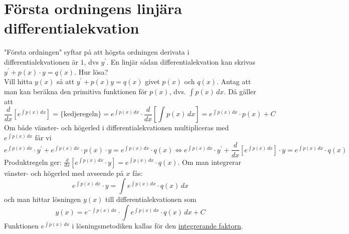\chapter{Första ordningens linjära differentialekvation}
"Första ordningen" syftar på att högsta ordningen derivata i differentialekvationen är $1$, dvs $y^\prime$.
En linjär sådan differentialekvation kan skrivas $y^\prime+p(x)\cdot y=q(x)$.
Hur lösa?\\
Vill hitta $y(x)$ så att $y^\prime+p(x)y=q(x)$ givet $p(x)$ och $q(x)$.
Antag att man kan beräkna den primitiva funktionen för $p(x)$, dvs. $\int p(x)\, dx$.
Då gäller att
\begin{equation*}
    \frac{d}{dx}[e^{\int p(x)\, dx}]=
    \{\text{kedjeregeln}\}=
    e^{\int p(x)\, dx}\cdot\frac{d}{dx}[\int p(x)\, dx]=
    e^{\int p(x)\, dx}\cdot p(x)+C
\end{equation*}
Om både vänster- och högerled i differentialekvationen multipliceras med $e^{\int p(x)\, dx}$ får vi
\begin{equation*}
    e^{\int p(x)\, dx}\cdot y^\prime+e^{\int p(x)\, dx}\cdot p(x)\cdot y=
    e^{\int p(x)\, dx}\cdot q(x)\Leftrightarrow
    e^{\int p(x)\, dx}\cdot y^\prime+\frac{d}{dx}[e^{\int p(x)\, dx}]\cdot y=
    e^{\int p(x)\, dx}\cdot q(x)
\end{equation*}
Produktregeln ger: $\frac{d}{dx}[e^{\int p(x)\, dx}\cdot y]=e^{\int p(x)\, dx}\cdot q(x)$.
Om man integrerar vänster- och högerled med avseende på $x$ fås:
\begin{equation*}
    e^{\int p(x)\, dx}\cdot y=\int e^{\int p(x)\, dx}\cdot q(x)\, dx
\end{equation*}
och man hittar lösningen $y(x)$ till differentialekvationen som
\begin{equation*}
    y(x)=e^{-\int p(x)\, dx}\cdot\int e^{\int p(x)\, dx}\cdot q(x)\, dx + C
\end{equation*}
Funktionen $e^{\int p(x)\, dx}$ i lösningsmetodiken kallas för den \underline{integrerande faktorn}.

